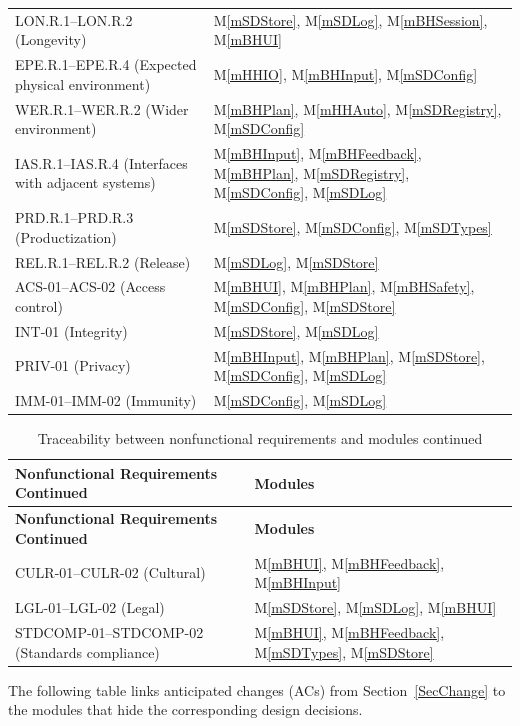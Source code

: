 \documentclass[12pt, titlepage]{article}
\newcommand{\mref}[1]{M\ref{#1}}
\begin{document}
\begin{longtable}{p{} p{}}
LON.R.1--LON.R.2 (Longevity)
  & \mref{mSDStore}, \mref{mSDLog}, \mref{mBHSession}, \mref{mBHUI} \\
EPE.R.1--EPE.R.4 (Expected physical environment)
  & \mref{mHHIO}, \mref{mBHInput}, \mref{mSDConfig} \\
WER.R.1--WER.R.2 (Wider environment)
  & \mref{mBHPlan}, \mref{mHHAuto}, \mref{mSDRegistry}, \mref{mSDConfig} \\
IAS.R.1--IAS.R.4 (Interfaces with adjacent systems)
  & \mref{mBHInput}, \mref{mBHFeedback}, \mref{mBHPlan}, \mref{mSDRegistry},
    \mref{mSDConfig}, \mref{mSDLog} \\
PRD.R.1--PRD.R.3 (Productization)
  & \mref{mSDStore}, \mref{mSDConfig}, \mref{mSDTypes} \\
REL.R.1--REL.R.2 (Release)
  & \mref{mSDLog}, \mref{mSDStore} \\
ACS-01--ACS-02 (Access control)
  & \mref{mBHUI}, \mref{mBHPlan}, \mref{mBHSafety}, \mref{mSDConfig},
    \mref{mSDStore} \\
INT-01 (Integrity)
  & \mref{mSDStore}, \mref{mSDLog} \\
PRIV-01 (Privacy)
  & \mref{mBHInput}, \mref{mBHPlan}, \mref{mSDStore}, \mref{mSDConfig},
    \mref{mSDLog} \\
IMM-01--IMM-02 (Immunity)
  & \mref{mSDConfig}, \mref{mSDLog} \\
\bottomrule
\end{longtable}

\renewcommand{\arraystretch}{1.1}
\begin{longtable}{p{} p{}}
\caption{Traceability between nonfunctional requirements and modules continued}
\label{TblNFRRTCont}\\
\toprule
\textbf{Nonfunctional Requirements Continued} & \textbf{Modules}\\
\midrule
\endfirsthead
\toprule
\textbf{Nonfunctional Requirements Continued} & \textbf{Modules}\\
\midrule
\endhead
CULR-01--CULR-02 (Cultural)
  & \mref{mBHUI}, \mref{mBHFeedback}, \mref{mBHInput} \\
LGL-01--LGL-02 (Legal)
  & \mref{mSDStore}, \mref{mSDLog}, \mref{mBHUI} \\
STDCOMP-01--STDCOMP-02 (Standards compliance)
  & \mref{mBHUI}, \mref{mBHFeedback}, \mref{mSDTypes}, \mref{mSDStore} \\
\bottomrule
\end{longtable}

The following table links anticipated changes (ACs) from
Section~\ref{SecChange} to the modules that hide the corresponding design
decisions.
\end{document}
